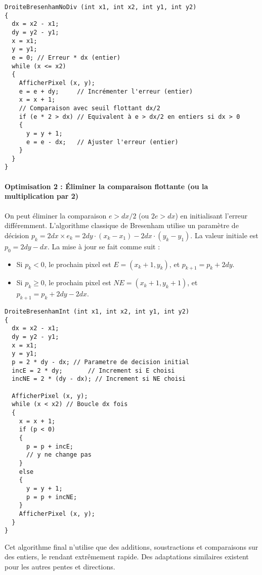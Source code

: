 \documentclass{article}
\begin{document}
\begin{lstlisting}[language=Pseudocode, caption={Bresenham sans division initiale (seuil flottant)}, label={lst:bresenham_nodiv}]
DroiteBresenhamNoDiv (int x1, int x2, int y1, int y2)
{
  dx = x2 - x1;
  dy = y2 - y1;
  x = x1;
  y = y1;
  e = 0; // Erreur * dx (entier)
  while (x <= x2)
  {
    AfficherPixel (x, y);
    e = e + dy;     // Incrémenter l'erreur (entier)
    x = x + 1;
    // Comparaison avec seuil flottant dx/2
    if (e * 2 > dx) // Equivalent à e > dx/2 en entiers si dx > 0
    {
      y = y + 1;
      e = e - dx;   // Ajuster l'erreur (entier)
    }
  }
}
\end{lstlisting}

\paragraph{Optimisation 2 : Éliminer la comparaison flottante (ou la multiplication par 2)}
On peut éliminer la comparaison $e > dx/2$ (ou $2e > dx$) en initialisant l'erreur différemment. L'algorithme classique de Bresenham utilise un paramètre de décision $p_k = 2 dx \times e_k = 2 dy \cdot (x_k - x_1) - 2 dx \cdot (y_k - y_1)$.
La valeur initiale est $p_0 = 2dy - dx$.
La mise à jour se fait comme suit :
\begin{itemize}
    \item Si $p_k < 0$, le prochain pixel est $E = (x_k+1, y_k)$, et $p_{k+1} = p_k + 2dy$.
    \item Si $p_k \ge 0$, le prochain pixel est $NE = (x_k+1, y_k+1)$, et $p_{k+1} = p_k + 2dy - 2dx$.
\end{itemize}

\begin{lstlisting}[language=Pseudocode, caption={Algorithme de Bresenham classique (entiers seulement)}, label={lst:bresenham_int}]
DroiteBresenhamInt (int x1, int x2, int y1, int y2)
{
  dx = x2 - x1;
  dy = y2 - y1;
  x = x1;
  y = y1;
  p = 2 * dy - dx; // Parametre de decision initial
  incE = 2 * dy;       // Increment si E choisi
  incNE = 2 * (dy - dx); // Increment si NE choisi

  AfficherPixel (x, y);
  while (x < x2) // Boucle dx fois
  {
    x = x + 1;
    if (p < 0)
    {
      p = p + incE;
      // y ne change pas
    }
    else
    {
      y = y + 1;
      p = p + incNE;
    }
    AfficherPixel (x, y);
  }
}
\end{lstlisting}

Cet algorithme final n'utilise que des additions, soustractions et comparaisons sur des entiers, le rendant extrêmement rapide. Des adaptations similaires existent pour les autres pentes et directions.
\end{document}
